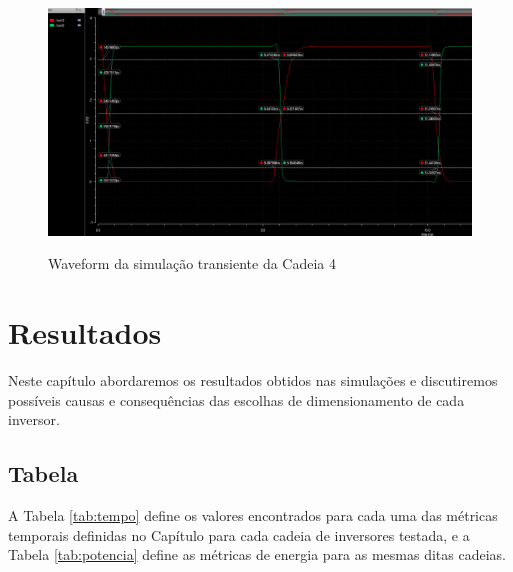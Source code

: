\documentclass{iiufrgs}
\begin{document}
\begin{figure}[htbp]
    \centering
    \caption{Waveform da simulação transiente da Cadeia 4}
    \includegraphics[scale=0.4]{images/wave_ex4.png}
    \label{fig:wave4}
\end{figure}

\FloatBarrier

\chapter{Resultados}\label{resultados}
Neste capítulo abordaremos os resultados obtidos nas simulações e discutiremos possíveis causas e consequências das escolhas de dimensionamento de cada inversor.

\section{Tabela}\label{tabela}
A Tabela \ref{tab:tempo} define os valores encontrados para cada uma das métricas temporais definidas no Capítulo  para cada cadeia de inversores testada, e a Tabela \ref{tab:potencia} define as métricas de energia para as mesmas ditas cadeias.
\end{document}
